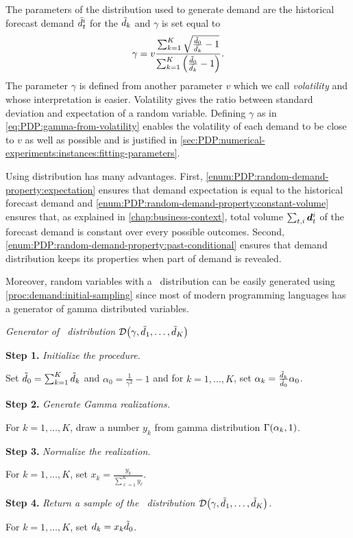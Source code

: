 The parameters of the \distrib distribution used to generate demand are the historical forecast demand $\bar{d}_t^i$ for the $\tilde{d}_k$ and $\gamma$ is set equal to
\begin{equation}\label{eq:PDP:gamma-from-volatility}
  \gamma
  =
  v\frac
  {\sum_{k=1}^K\sqrt{\frac{\tilde{\demand}_0}{\bar{\demand_k}}-1}}
  {\sum_{k=1}^K\bracket{\frac{\tilde{\demand}_0}{\bar{\demand_k}}-1}}.
\end{equation}
The parameter $\gamma$ is defined from another parameter $v$ which we call \emph{volatility} and whose interpretation is easier.
Volatility gives the ratio between standard deviation and expectation of a random variable.
Defining $\gamma$ as in \cref{eq:PDP:gamma-from-volatility} enables the volatility of each demand to be close to $v$ as well as possible and is justified in \cref{sec:PDP:numerical-experiments:instances:fitting-parameters}.


Using \distrib distribution has many advantages.
First, \cref{enum:PDP:random-demand-property:expectation} ensures that demand expectation is equal to the historical forecast demand and \cref{enum:PDP:random-demand-property:constant-volume} ensures that, as explained in \cref{chap:business-context}, total volume $\sum_{t,i}\va\demand_t^i$ of the forecast demand is constant over every possible outcomes.
Second, \cref{enum:PDP:random-demand-property:past-conditional} ensures that demand distribution keeps its properties when part of demand is revealed.


Moreover, random variables with a \distrib\ distribution can be easily generated using \cref{proc:demand:initial-sampling} since most of modern programming languages has a generator of gamma distributed variables.


\begin{proc}\label{proc:demand:initial-sampling}
\emph{Generator of \distrib\ distribution $\cD\bracket{\gamma,\tilde{\demand}_1,\ldots,\tilde{\demand}_K}$}

\textbf{Step 1.} \emph{Initialize the procedure.}

Set $\tilde{d}_0 = \sum_{k=1}^K\tilde{d}_k$ and $\alpha_0 = \frac{1}{\gamma^2}-1$ and for $k=1,\ldots,K$, set $\alpha_k=\frac{\tilde{d}_k}{\tilde{d}_0}\alpha_0$.

\textbf{Step 2.} \emph{Generate Gamma realizations.}

For $k=1,\ldots,K$, draw a number $y_k$ from gamma distribution $\Gamma\bracket{\alpha_k,1}$.

\textbf{Step 3.} \emph{Normalize the realization.}

For $k=1,\ldots,K$, set $x_k=\frac{y_k}{\sum_{\ell=1}^K y_{\ell}}$.

\textbf{Step 4.} \emph{Return a sample of the \distrib\ distribution $\cD\bracket{\gamma,\tilde{\demand}_1,\ldots,\tilde{\demand}_K}$.}

For $k=1,\ldots,K$, set $d_k = x_k \tilde{d}_0$.
\end{proc}


